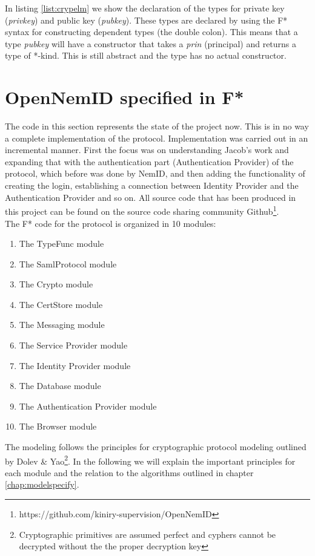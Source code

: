\documentclass[twosided]{report}
\begin{document}
In listing \ref{list:crypelm} we show the declaration of the types for private key (\emph{privkey}) and public key (\emph{pubkey}). These types are declared by using the F* syntax for constructing dependent types (the double colon). This means that a type \emph{pubkey} will have a constructor that takes a \emph{prin} (principal) and returns a type of *-kind. This is still abstract and the type has no actual constructor.

\section{OpenNemID specified in F*}
The code in this section represents the state of the project now. This is in no way a complete implementation of the protocol. Implementation was carried out in an incremental manner. First the focus was on understanding Jacob's work and expanding that with the authentication part (Authentication Provider) of the protocol, which before was done by NemID, and then adding the functionality of creating the login, establishing a connection between Identity Provider and the Authentication Provider and so on. All source code that has been produced in this project can be found on the source code sharing community Github\footnote{https://github.com/kiniry-supervision/OpenNemID}.
\\The F* code for the protocol is organized in 10 modules:
\begin{enumerate}
	\item The TypeFunc module
	\item The SamlProtocol module
	\item The Crypto module
	\item The CertStore module
	\item The Messaging module
	\item The Service Provider module
	\item The Identity Provider module
	\item The Database module
	\item The Authentication Provider module
	\item The Browser module
\end{enumerate}
The modeling follows the principles for cryptographic protocol modeling outlined by Dolev \& Yao\footnote{Cryptographic primitives are assumed perfect and cyphers cannot be decrypted without the the proper decryption key}. In the following we will explain the important principles for each module and the relation to the algorithms outlined in chapter \ref{chap:modelspecify}.
\end{document}
